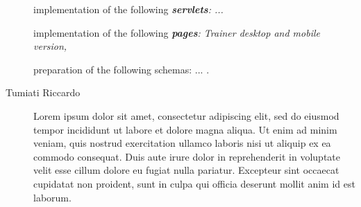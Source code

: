 \begin{description}
	implementation of the following \textit{\textbf{servlets}: 
	    ... 
    }
    
	implementation of the following \textit{\textbf{pages}: 
	    Trainer desktop and mobile version,
    }
    
    preparation of the following schemas: ... .
	\item[Tumiati Riccardo] Lorem ipsum dolor sit amet, consectetur adipiscing elit, sed do eiusmod tempor incididunt ut labore et dolore magna aliqua. Ut enim ad minim veniam, quis nostrud exercitation ullamco laboris nisi ut aliquip ex ea commodo consequat. Duis aute irure dolor in reprehenderit in voluptate velit esse cillum dolore eu fugiat nulla pariatur. Excepteur sint occaecat cupidatat non proident, sunt in culpa qui officia deserunt mollit anim id est laborum.
\end{description}
